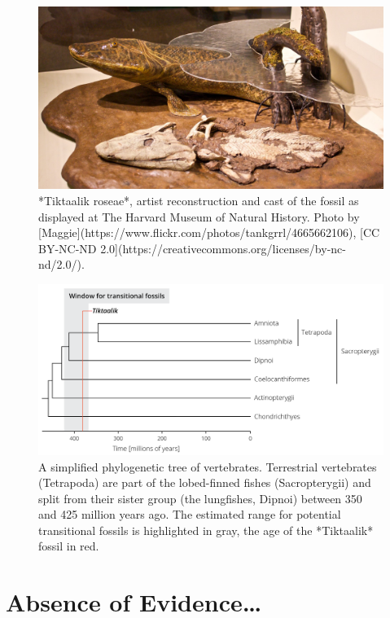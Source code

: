 \documentclass[
]{book}
\begin{document}
\begin{figure}
\includegraphics[width=1\linewidth]{images/tiktaalik} \caption{*Tiktaalik roseae*, artist reconstruction and cast of the fossil as displayed at The Harvard Museum of Natural History. Photo by [Maggie](https://www.flickr.com/photos/tankgrrl/4665662106), [CC BY-NC-ND 2.0](https://creativecommons.org/licenses/by-nc-nd/2.0/).}\label{fig:tiktaalik}
\end{figure}

\begin{figure}
\includegraphics[width=1\linewidth]{images/titaakphyl} \caption{A simplified phylogenetic tree of vertebrates. Terrestrial vertebrates (Tetrapoda) are part of the lobed-finned fishes (Sacropterygii) and split from their sister group (the lungfishes, Dipnoi) between 350 and 425 million years ago. The estimated range for potential transitional fossils is highlighted in gray, the age of the *Tiktaalik* fossil in red. }\label{fig:vertphylo}
\end{figure}

\hypertarget{absence-of-evidence}{%
\section{Absence of Evidence\ldots{}}\label{absence-of-evidence}}
\end{document}
